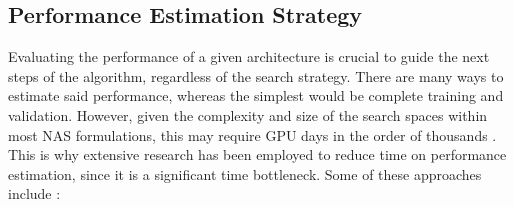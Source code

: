 \documentclass[10pt,        %
               a4paper,     %
               journal,     %
               ]{IEEEtran}
\begin{document}

\subsection{Performance Estimation Strategy}
\label{PES}
Evaluating the performance of a given architecture is crucial to guide the next steps of the algorithm, regardless of the search
strategy. There are many ways to estimate said performance, whereas the simplest would be complete training and validation.
However, given the complexity and size of the search spaces within most NAS formulations, this
may require GPU days in the order of thousands \cite{elsken2019neural}.
This is why extensive research has been
employed to reduce time on performance estimation, since it is a significant time bottleneck.
Some of these approaches include \cite{elsken2019neural}:
\end{document}
